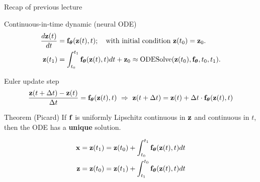 \begin{frame}{Recap of previous lecture}
	\begin{block}{Continuous-in-time dynamic (neural ODE)}
		\vspace{-0.7cm}
		\begin{align*}
		   \frac{d \mathbf{z}(t)}{dt} &= \mathbf{f}_{\boldsymbol{\theta}}(\mathbf{z}(t), t); \quad \text{with initial condition }\mathbf{z}(t_0) = \mathbf{z}_0. \\
		   \mathbf{z}(t_1) &= \int^{t_1}_{t_0} \mathbf{f}_{\boldsymbol{\theta}}(\mathbf{z}(t), t) d t  + \mathbf{z}_0 \approx \text{ODESolve}(\mathbf{z}(t_0), \mathbf{f}_{\boldsymbol{\theta}}, t_0,t_1).
		\end{align*}
		\vspace{-0.7cm}
	\end{block}	
	\begin{block}{Euler update step}
		\vspace{-0.6cm}
		\[
   \frac{\mathbf{z}(t + \Delta t) - \mathbf{z}(t)}{\Delta t} = \mathbf{f}_{\boldsymbol{\theta}}(\mathbf{z}(t), t) \,\, \Rightarrow \,\, \mathbf{z}(t + \Delta t) = \mathbf{z}(t) + \Delta t \cdot \mathbf{f}_{\boldsymbol{\theta}}(\mathbf{z}(t), t)
		\]
		\vspace{-0.7cm}
	\end{block}	
	\begin{block}{Theorem (Picard)}
		If $\mathbf{f}$ is uniformly Lipschitz continuous in $\mathbf{z}$ and continuous in $t$, then the ODE has a \textbf{unique} solution.
	\end{block}
		\vspace{-0.7cm}
		\begin{align*}
			\mathbf{x} &= \mathbf{z}(t_1) = \mathbf{z}(t_0) + \int_{t_0}^{t_1} \mathbf{f}_{\boldsymbol{\theta}}(\mathbf{z}(t), t) dt \\
			\mathbf{z} &= \mathbf{z}(t_0) = \mathbf{z}(t_1) + \int_{t_1}^{t_0} \mathbf{f}_{\boldsymbol{\theta}}(\mathbf{z}(t), t) dt
		\end{align*}
\end{frame}
